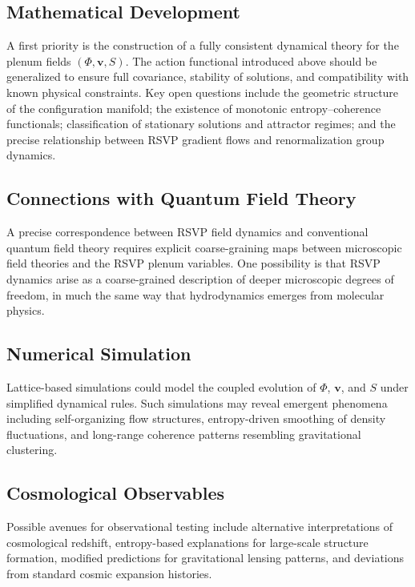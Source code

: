 \documentclass[12pt,a4paper]{article}
\theoremstyle{plain}
\theoremstyle{definition}
\theoremstyle{remark}
\begin{document}
\subsection{Mathematical Development}

A first priority is the construction of a fully consistent dynamical
theory for the plenum fields $(\Phi,\mathbf{v},S)$. The action
functional introduced above should be generalized to ensure full
covariance, stability of solutions, and compatibility with known
physical constraints. Key open questions include the geometric structure
of the configuration manifold; the existence of monotonic
entropy--coherence functionals; classification of stationary solutions
and attractor regimes; and the precise relationship between RSVP
gradient flows and renormalization group dynamics.

\subsection{Connections with Quantum Field Theory}

A precise correspondence between RSVP field dynamics and conventional
quantum field theory requires explicit coarse-graining maps between
microscopic field theories and the RSVP plenum variables. One
possibility is that RSVP dynamics arise as a coarse-grained description
of deeper microscopic degrees of freedom, in much the same way that
hydrodynamics emerges from molecular physics.

\subsection{Numerical Simulation}

Lattice-based simulations could model the coupled evolution of
$\Phi$, $\mathbf{v}$, and $S$ under simplified dynamical rules.
Such simulations may reveal emergent phenomena including
self-organizing flow structures, entropy-driven smoothing of density
fluctuations, and long-range coherence patterns resembling
gravitational clustering.

\subsection{Cosmological Observables}

Possible avenues for observational testing include alternative
interpretations of cosmological redshift, entropy-based explanations
for large-scale structure formation, modified predictions for
gravitational lensing patterns, and deviations from standard cosmic
expansion histories.
\end{document}
